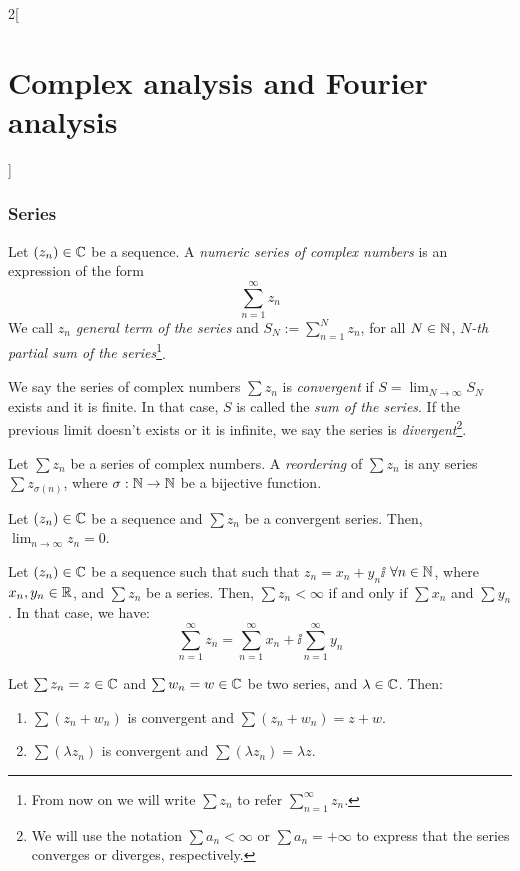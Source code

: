 \documentclass[../../../main.tex]{subfiles}
\begin{document}
\begin{multicols}{2}[\section{Complex analysis and Fourier analysis}]
  \subsubsection{Series}
  \begin{definition}
    Let $(z_n)\in\mathbb{C}$ be a sequence. A \emph{numeric series of complex numbers} is an expression of the form $$\sum_{n=1}^\infty z_n$$ We call $z_n$ \emph{general term of the series} and $\displaystyle S_N:=\sum_{n=1}^N z_n$, for all $N\in\mathbb{N} $, \emph{$N$-th partial sum of the series}\footnote{From now on we will write $\sum z_n$ to refer $\displaystyle\sum_{n=1}^\infty z_n$.}.
  \end{definition}
  \begin{definition}
    We say the series of complex numbers $\sum z_n$ is \emph{convergent} if $\displaystyle S=\lim_{N\to\infty}S_N$ exists and it is finite. In that case, $S$ is called the \emph{sum of the series}. If the previous limit doesn't exists or it is infinite, we say the series is \emph{divergent}\footnote{We will use the notation $\sum a_n<\infty$ or $\sum a_n=+\infty$ to express that the series converges or diverges, respectively.}.
  \end{definition}
  \begin{definition}
    Let $\sum z_n$ be a series of complex numbers.  A \emph{reordering} of $\sum z_n$ is any series $\sum z_{\sigma(n)}$, where $\sigma:\mathbb{N}\rightarrow\mathbb{N}$ be a bijective function.
  \end{definition}
  \begin{proposition}
    Let $(z_n)\in\mathbb{C}$ be a sequence and $\sum z_n$ be a convergent series. Then, $\displaystyle\lim_{n\to\infty}z_n =0$.
  \end{proposition}
  \begin{proposition}
    Let $(z_n)\in\mathbb{C}$ be a sequence such that such that $z_n=x_n+y_n\ii$ $\forall n\in\mathbb{N}$, where $x_n,y_n\in\mathbb{R}$, and $\sum z_n$ be a series. Then, $\sum z_n<\infty$ if and only if $\sum x_n$ and $\sum y_n$. In that case, we have: $$\sum_{n=1}^\infty z_n=\sum_{n=1}^\infty x_n+\ii\sum_{n=1}^\infty y_n$$
  \end{proposition}
  \begin{proposition}
    Let $\sum z_n=z\in\mathbb{C}$ and $\sum w_n=w\in\mathbb{C}$ be two series, and $\lambda\in\mathbb{C}$. Then:
    \begin{enumerate}
      \item $\sum (z_n+w_n)$ is convergent and $\sum (z_n+w_n)=z+w$.
      \item $\sum (\lambda z_n)$ is convergent and $\sum (\lambda z_n)=\lambda z$.

\end{enumerate}
\end{proposition}
\end{multicols}
\end{document}
